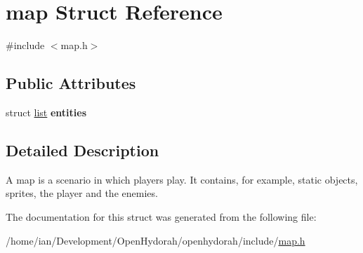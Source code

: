 \hypertarget{structmap}{\section{map Struct Reference}
\label{structmap}
}


{\ttfamily \#include $<$map.\-h$>$}

\subsection*{Public Attributes}
\begin{DoxyCompactItemize}
\item 
\hypertarget{structmap_a9fee5db90e78c749cd83265cd00f4f2c}{struct \hyperlink{structlist}{list} {\bfseries entities}}\label{structmap_a9fee5db90e78c749cd83265cd00f4f2c}

\end{DoxyCompactItemize}


\subsection{Detailed Description}
A map is a scenario in which players play. It contains, for example, static objects, sprites, the player and the enemies. 

The documentation for this struct was generated from the following file\-:\begin{DoxyCompactItemize}
\item 
/home/ian/\-Development/\-Open\-Hydorah/openhydorah/include/\hyperlink{map_8h}{map.\-h}\end{DoxyCompactItemize}
